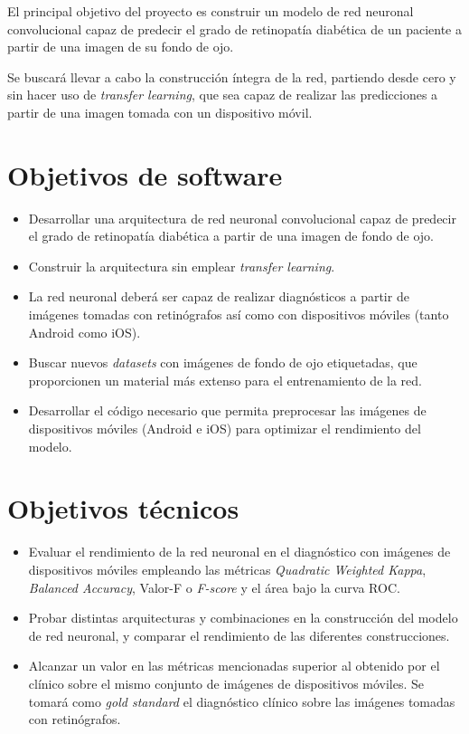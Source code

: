
El principal objetivo del proyecto es construir un modelo de red neuronal convolucional capaz de predecir el grado de retinopatía diabética de un paciente a partir de una imagen de su fondo de ojo.

Se buscará llevar a cabo la construcción íntegra de la red, partiendo desde cero y sin hacer uso de \textit{transfer learning}, que sea capaz de realizar las predicciones a partir de una imagen tomada con un dispositivo móvil.

\section{Objetivos de software}
\begin{itemize}[itemsep=0.25em]
    \item Desarrollar una arquitectura de red neuronal convolucional capaz de predecir el grado de retinopatía diabética a partir de una imagen de fondo de ojo.
    \item Construir la arquitectura sin emplear \textit{transfer learning}.
    \item La red neuronal deberá ser capaz de realizar diagnósticos a partir de imágenes tomadas con retinógrafos así como con dispositivos móviles (tanto Android como iOS).
    \item Buscar nuevos \textit{datasets} con imágenes de fondo de ojo etiquetadas, que proporcionen un material más extenso para el entrenamiento de la red.
    \item Desarrollar el código necesario que permita preprocesar las imágenes de dispositivos móviles (Android e iOS) para optimizar el rendimiento del modelo.
\end{itemize}

\section{Objetivos técnicos}
\begin{itemize}[itemsep=0.25em]
    \item Evaluar el rendimiento de la red neuronal en el diagnóstico con imágenes de dispositivos móviles empleando las métricas \textit{Quadratic Weighted Kappa}, \textit{Balanced Accuracy}, Valor-F o \textit{F-score} y el área bajo la curva ROC.
    \item Probar distintas arquitecturas y combinaciones en la construcción del modelo de red neuronal, y comparar el rendimiento de las diferentes construcciones. 
    \item Alcanzar un valor en las métricas mencionadas superior al obtenido por el clínico sobre el mismo conjunto de imágenes de dispositivos móviles. Se tomará como \textit{gold standard} el diagnóstico clínico sobre las imágenes tomadas con retinógrafos.
\end{itemize}

